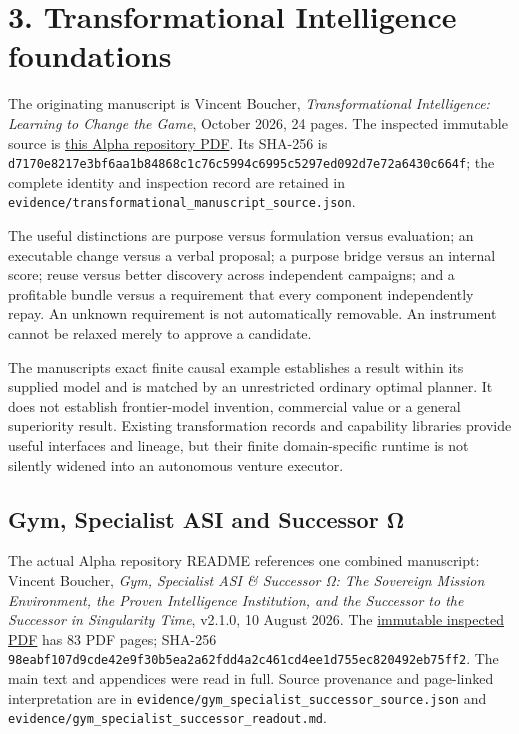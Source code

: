 \documentclass[
  10pt,
]{article}
\let\studysection\section
\renewcommand{\section}{\Needspace{7\baselineskip}\studysection}
\let\studysubsection\subsection
\renewcommand{\subsection}{\Needspace{5\baselineskip}\studysubsection}
\begin{document}
\hypertarget{3-transformational-intelligence-foundations}{%
\section{3. Transformational Intelligence
foundations}\label{3-transformational-intelligence-foundations}}

The originating manuscript is Vincent Boucher, \emph{Transformational
Intelligence: Learning to Change the Game}, October 2026, 24 pages. The
inspected immutable source is
\href{https://github.com/MontrealAI/AGI-Alpha-Agent-v0/blob/098117379f2920ebe37ab23dad77b7314a32518c/docs/Transformational_Intelligence.pdf}{this
Alpha repository PDF}. Its SHA-256 is
\nolinkurl{d7170e8217e3bf6aa1b84868c1c76c5994c6995c5297ed092d7e72a6430c664f};
the complete identity and inspection record are retained in
\nolinkurl{evidence/transformational_manuscript_source.json}.

The useful distinctions are purpose versus formulation versus
evaluation; an executable change versus a verbal proposal; a purpose
bridge versus an internal score; reuse versus better discovery across
independent campaigns; and a profitable bundle versus a requirement that
every component independently repay. An unknown requirement is not
automatically removable. An instrument cannot be relaxed merely to
approve a candidate.

The manuscript\textquotesingle s exact finite causal example establishes
a result within its supplied model and is matched by an unrestricted
ordinary optimal planner. It does not establish frontier-model
invention, commercial value or a general superiority result. Existing
transformation records and capability libraries provide useful
interfaces and lineage, but their finite domain-specific runtime is not
silently widened into an autonomous venture executor.

\hypertarget{gym-specialist-asi-and-successor-ux3c9}{%
\subsection{Gym, Specialist ASI and Successor
Ω}\label{gym-specialist-asi-and-successor-ux3c9}}

The actual Alpha repository README references one combined manuscript:
Vincent Boucher, \emph{Gym, Specialist ASI \& Successor Ω: The Sovereign
Mission Environment, the Proven Intelligence Institution, and the
Successor to the Successor in Singularity Time}, v2.1.0, 10 August 2026.
The
\href{https://github.com/MontrealAI/MontrealAI.github.io/blob/a9cc143bc05495405ac63b0e2645c425d66410b8/GoalOS_Gym_Specialist_ASI_Successor_Omega_v2_1_0_US_LETTER.pdf}{immutable
inspected PDF} has 83 PDF pages; SHA-256
\nolinkurl{98eabf107d9cde42e9f30b5ea2a62fdd4a2c461cd4ee1d755ec820492eb75ff2}.
The main text and appendices were read in full. Source provenance and
page-linked interpretation are in
\nolinkurl{evidence/gym_specialist_successor_source.json} and
\nolinkurl{evidence/gym_specialist_successor_readout.md}.
\end{document}
